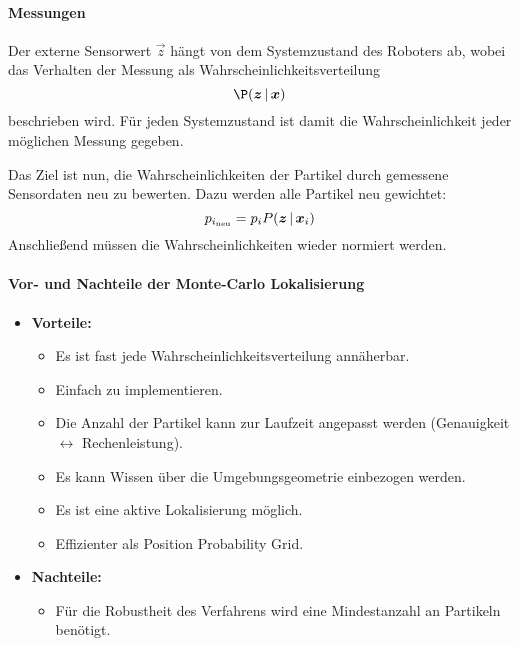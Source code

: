 				\paragraph{Messungen}
					Der externe Sensorwert \( \vec{z} \) hängt von dem Systemzustand des Roboters ab, wobei das Verhalten der Messung als Wahrscheinlichkeitsverteilung
					\begin{equation*}
						\P(\vec{z} \given \vec{x})
					\end{equation*}
					beschrieben wird. Für jeden Systemzustand ist damit die Wahrscheinlichkeit jeder möglichen Messung gegeben.

					Das Ziel ist nun, die Wahrscheinlichkeiten der Partikel durch gemessene Sensordaten neu zu bewerten. Dazu werden alle Partikel neu gewichtet:
					\begin{equation*}
						p_{i_\text{neu}} = p_i P(\bm{z} \,\vert\, \bm{x}_i)
					\end{equation*}
					Anschließend müssen die Wahrscheinlichkeiten wieder normiert werden.

				\paragraph{Vor- und Nachteile der Monte-Carlo Lokalisierung}
					\begin{itemize}
						\item \textbf{Vorteile:}
							\begin{itemize}
								\item Es ist fast jede Wahrscheinlichkeitsverteilung annäherbar.
								\item Einfach zu implementieren.
								\item Die Anzahl der Partikel kann zur Laufzeit angepasst werden (Genauigkeit \(\leftrightarrow\) Rechenleistung).
								\item Es kann Wissen über die Umgebungsgeometrie einbezogen werden.
								\item Es ist eine aktive Lokalisierung möglich.
								\item Effizienter als Position Probability Grid.
							\end{itemize}
						\item \textbf{Nachteile:}
							\begin{itemize}
								\item Für die Robustheit des Verfahrens wird eine Mindestanzahl an Partikeln benötigt.
							\end{itemize}
					\end{itemize}

